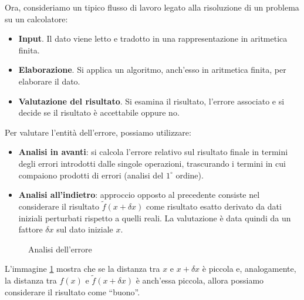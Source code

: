 \documentclass{article}
\begin{document}
Ora, consideriamo un tipico flusso di lavoro legato alla risoluzione di un
problema su un calcolatore:
\begin{itemize}
    \item \textbf{Input}. Il dato viene letto e tradotto in
        una rappresentazione in aritmetica finita.
    \item \textbf{Elaborazione}. Si applica un algoritmo, anch'esso in aritmetica
    finita, per elaborare il dato.
    \item \textbf{Valutazione del risultato}. Si esamina il risultato,
        l'errore associato e si decide se il risultato è
        accettabile oppure no.
\end{itemize}
Per valutare l'entità dell'errore, possiamo utilizzare:
\begin{itemize}
    \item\textbf{Analisi in avanti}: si calcola l'errore relativo sul
        risultato finale in termini degli errori introdotti dalle singole
        operazioni, trascurando i termini in cui compaiono prodotti di errori
        (analisi del $1^{\circ}$ ordine).
    \item\textbf{Analisi all'indietro}: approccio opposto al precedente
        consiste nel considerare il risultato $\tilde{f}(x+\delta x)$ come risultato 
        esatto derivato da dati iniziali perturbati rispetto a quelli reali.
        La valutazione è data quindi da un fattore
        $\delta x$ sul dato iniziale $x$.
\end{itemize}
\begin{figure}
    \centering
\caption{Analisi dell'errore}
\label{fig:analisi_errore}
\end{figure}
L'immagine \ref{fig:analisi_errore} mostra che se la distanza tra $x$ e
$x+\delta x$ è piccola e, analogamente, la distanza tra $f(x)$ e
$\tilde{f}(x+\delta x)$ è anch'essa piccola, allora possiamo considerare il
risultato come ``buono''.
\end{document}

